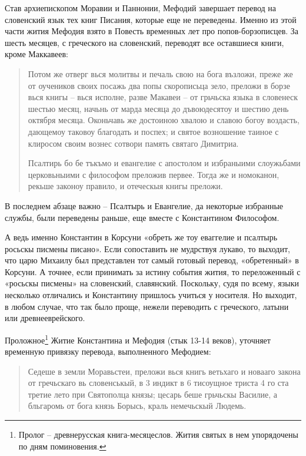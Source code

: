\documentclass[a5paper,11pt,openany]{article}
\begin{document}
Став архиепископом Моравии и Паннонии, Мефодий завершает перевод на словенский язык тех книг Писания, которые еще не переведены. Именно из этой части жития Мефодия взято в Повесть временных лет про попов-борзописцев. За шесть месяцев, с греческого на словенский, переводят все оставшиеся книги, кроме Маккавеев: 

\begin{quotation}
Потом же отверг вься молитвы и печаль свою на бога възложи, преже же от оучеников своих посажь два попы скорописьца зело, преложи в борзе вься книгы – вься исполне, разве Макавеи – от грьчьска языка в словенеск шестью месяц, начьнь от марда месяца до дъвоюдесятоу и шестию день октября месяца. Оконьчавь же достоиною хвалою и славою богоу воздасть, дающемоу таковоу благодать и поспех; и святое возношение таиное с клиросом своим вознес сотвори память святаго Димитриа.

Псалтирь бо бе тъкъмо и евангелие с апостолом и избраныими слоужьбами церковьныими с философом преложив первее. Тогда же и номоканон, рекьше законоу правило, и отеческыя книгы преложи.
\end{quotation}

В последнем абзаце важно – Псалтырь и Евангелие, да некоторые избранные службы, были переведены раньше, еще вместе с Константином Философом. 

А ведь именно Константин в Корсуни «обреть же тоу еваггелие и псалтырь росьскы писмены писано». Если сопоставить не мудрствуя лукаво, то выходит, что царю Михаилу был представлен тот самый готовый перевод, «обретенный» в Корсуни. А точнее, если принимать за истину события жития, то переложенный с «росьскы писмены» на словенский, славянский. Поскольку, судя по всему, языки несколько отличались и Константину пришлось учиться у носителя. Но выходит, в любом случае, что так было проще, нежели переводить с греческого, латыни или древнееврейского.

Проложное\footnote{Пролог – древнерусская книга-месяцеслов. Жития святых в нем упорядочены по дням поминовения.} Житие Константина и Мефодия (стык 13-14 веков), уточняет временную привязку перевода, выполненного Мефодием:

\begin{quotation}
Седеше в земли Моравьстеи, преложи вься книгь ветьхаго и новааго закона от гречьскаго вь словенськый, в 3 индикт в 6 тисоущное триста 4 го ста третие лето при Святополца князы; цесарь беше грьчьскы Василие, а бльгаромь от бога князь Борысь, краль немечьскый Людемь.
\end{quotation}
\end{document}
